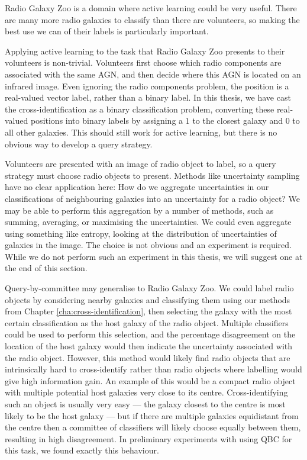     Radio Galaxy Zoo \citep{banfield15} is a domain where active learning could
    be very useful. There are many more radio galaxies to classify than there
    are volunteers, so making the best use we can of their labels is
    particularly important.

    Applying active learning to the task that Radio Galaxy Zoo presents to their
    volunteers is non-trivial. Volunteers first choose which radio components
    are associated with the same AGN, and then decide where this AGN is located
    on an infrared image. Even ignoring the radio components problem, the
    position is a real-valued vector label, rather than a binary label. In this
    thesis, we have cast the cross-identification as a binary classification
    problem, converting these real-valued positions into binary labels by
    assigning a $1$ to the closest galaxy and $0$ to all other galaxies. This
    should still work for active learning, but there is no obvious way to
    develop a query strategy.

    Volunteers are presented with an image of radio object to label, so a query
    strategy must choose radio objects to present. Methods like uncertainty
    sampling have no clear application here: How do we aggregate uncertainties
    in our classifications of neighbouring galaxies into an uncertainty for a
    radio object? We may be able to perform this aggregation by a number of
    methods, such as summing, averaging, or maximising the uncertainties. We
    could even aggregate using something like entropy, looking at the
    distribution of uncertainties of galaxies in the image. The choice is not
    obvious and an experiment is required. While we do not perform such an
    experiment in this thesis, we will suggest one at the end of this section.

    Query-by-committee may generalise to Radio Galaxy Zoo. We could label radio
    objects by considering nearby galaxies and classifying them using our
    methods from Chapter \ref{cha:cross-identification}, then selecting the
    galaxy with the most certain classification as the host galaxy of the radio
    object. Multiple classifiers could be used to perform this selection, and
    the percentage disagreement on the location of the host galaxy would then
    indicate the uncertainty associated with the radio object. However, this
    method would likely find radio objects that are intrinsically hard to
    cross-identify rather than radio objects where labelling would give high
    information gain. An example of this would be a compact radio object with
    multiple potential host galaxies very close to its centre. Cross-identifying
    such an object is usually very easy --- the galaxy closest to the centre is
    most likely to be the host galaxy --- but if there are multiple galaxies
    equidistant from the centre then a committee of classifiers will likely
    choose equally between them, resulting in high disagreement. In preliminary
    experiments with using QBC for this task, we found exactly this behaviour.

